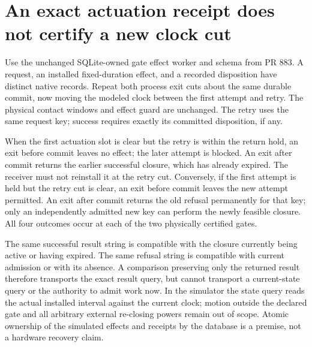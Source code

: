 \documentclass{article}
\begin{document}
\section*{An exact actuation receipt does not certify a new clock cut}
Use the unchanged SQLite-owned gate effect worker and schema from
PR 883. A request, an installed fixed-duration effect, and a recorded
disposition have distinct native records. Repeat both process exit
cuts about the same durable commit, now moving the modeled clock
between the first attempt and retry. The physical contact windows
and effect guard are unchanged. The retry uses the same request key;
success requires exactly its committed disposition, if any.

When the first actuation slot is clear but the retry is within the
return hold, an exit before commit leaves no effect; the later attempt
is blocked. An exit after commit returns the earlier successful
closure, which has already expired. The receiver must not reinstall
it at the retry cut. Conversely, if the first attempt is held but the
retry cut is clear, an exit before commit leaves the new attempt
permitted. An exit after commit returns the old refusal permanently
for that key; only an independently admitted new key can perform
the newly feasible closure. All four outcomes occur at each of
the two physically certified gates.

The same successful result string is compatible with the closure
currently being active or having expired. The same refusal string is
compatible with current admission or with its absence. A comparison
preserving only the returned result therefore transports the exact
result query, but cannot transport a current-state query or the
authority to admit work now. In the simulator the state query reads
the actual installed interval against the current clock; motion outside
the declared gate and all arbitrary external re-closing powers remain
out of scope. Atomic ownership of the simulated effects and receipts
by the database is a premise, not a hardware recovery claim.
\end{document}
